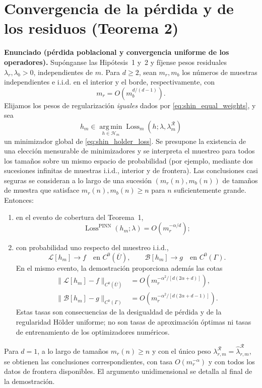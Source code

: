 \section{Convergencia de la pérdida y de los residuos (Teorema 2)}

\noindent\textbf{Enunciado (pérdida poblacional y convergencia uniforme de los operadores).}
Supónganse las Hipótesis~1 y~2 y fíjense pesos residuales
$\lambda_r,\lambda_b>0$, independientes de $m$. Para $d\geq2$, sean $m_r,m_b$ los números de muestras
independientes e i.i.d. en el interior y el borde, respectivamente, con
\[
m_r=O\!\left(m_b^{d/(d-1)}\right).
\]
Elijamos los pesos de regularización \emph{iguales} dados por
\eqref{eq:shin_equal_weights}, y sea
\[
h_m\in\operatorname*{arg\,min}_{h\in\mathcal H_m}
\operatorname{Loss}_m(h;\lambda,\lambda_m^{\mathcal R})
\]
un minimizador global de \eqref{eq:shin_holder_loss}.
Se presupone la existencia de una elección mensurable de minimizadores y
se interpreta el muestreo para todos los tamaños sobre un mismo espacio
de probabilidad (por ejemplo, mediante dos sucesiones infinitas de muestras
i.i.d., interior y de frontera). Las conclusiones casi seguras se consideran
a lo largo de una sucesión
$(m_r(n),m_b(n))$ de tamaños de muestra que satisface
$m_r(n),m_b(n)\geq n$ para $n$ suficientemente grande.
Entonces:
\begin{enumerate}
\item en el evento de cobertura del Teorema~1,
\begin{equation}\label{eq:shin_expected_rate}
\operatorname{Loss}^{\mathrm{PINN}}(h_m;\lambda)
=O\!\left(m_r^{-\alpha/d}\right);
\end{equation}
\item con probabilidad uno respecto del muestreo i.i.d.,
\begin{equation}\label{eq:shin_uniform_operators}
\mathcal L[h_m]\longrightarrow f
\quad\text{en }C^0(\overline U),
\qquad
\mathcal B[h_m]\longrightarrow g
\quad\text{en }C^0(\Gamma).
\end{equation}
En el mismo evento, la demostración proporciona además las cotas
\begin{equation}\label{eq:shin_sup_rates}
\begin{aligned}
\|\mathcal L[h_m]-f\|_{C^0(\overline U)}
&=O\!\left(m_r^{-\alpha^2/[d(2\alpha+d)]}\right),\\
\|\mathcal B[h_m]-g\|_{C^0(\Gamma)}
&=O\!\left(m_r^{-\alpha^2/[d(2\alpha+d-1)]}\right).
\end{aligned}
\end{equation}
Estas tasas son consecuencias de la desigualdad de pérdida y de la
regularidad Hölder uniforme; no son tasas de aproximación óptimas ni
tasas de entrenamiento de los optimizadores numéricos.
\end{enumerate}
Para $d=1$, a lo largo de tamaños $m_r(n)\geq n$ y con el único peso
$\lambda_{r,m}^{\mathcal R}=\hat\lambda_{r,m}^{\mathcal R}$, se obtienen las
conclusiones correspondientes, con tasa $O(m_r^{-\alpha})$ y con todos los datos de
frontera disponibles. El argumento unidimensional se detalla al final de la demostración.

